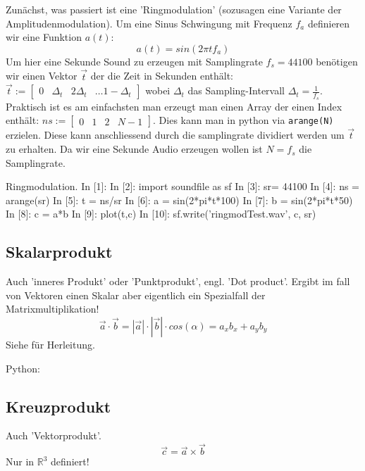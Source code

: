 \begin{answer}
Zunächst, was passiert ist eine 'Ringmodulation' (sozusagen eine Variante der Amplitudenmodulation). Um eine Sinus Schwingung mit Frequenz $f_a$ definieren wir eine Funktion $a(t)$:
\begin{equation}
a(t) = sin(2 \pi t f_a)
\end{equation}
Um hier eine Sekunde Sound zu erzeugen mit Samplingrate $f_s = 44100$ benötigen wir einen Vektor $\vec{t}$ der die Zeit in Sekunden enthält: $\vec{t}:= \begin{bmatrix} 0 & \Delta_t& 2 \Delta_t &  \dots 1-\Delta_t \end{bmatrix}$ wobei $\Delta_t$ das Sampling-Intervall $\Delta_t = \frac{1}{f_s}$. Praktisch ist es am einfachsten man erzeugt man einen Array der einen Index enthält: $ns := \begin{bmatrix} 0 & 1 & 2 &  N-1 \end{bmatrix}$. Dies kann man in python via \texttt{arange(N)} erzielen. Diese kann anschliessend durch die samplingrate dividiert werden um $\vec{t}$ zu erhalten. Da wir eine Sekunde Audio erzeugen wollen ist $N=f_s$ die Samplingrate.


\begin{python}{Ringmodulation.}
In [1]: %
In [2]: import soundfile as sf
In [3]: sr= 44100
In [4]: ns = arange(sr)
In [5]: t = ns/sr
In [6]: a = sin(2*pi*t*100)
In [7]: b = sin(2*pi*t*50)
In [8]: c = a*b
In [9]: plot(t,c)
In [10]: sf.write('ringmodTest.wav', c, sr)
\end{python}
\end{answer}


\subsection*{Skalarprodukt}

Auch 'inneres Produkt' oder 'Punktprodukt', engl. 'Dot product'. Ergibt im fall von Vektoren einen Skalar aber eigentlich ein Spezialfall der Matrixmultiplikation!
$$\vec{a}\cdot \vec{b} = |\vec{a}|\cdot |\vec{b}|\cdot cos(\alpha) = a_x b_x + a_y b_y$$
Siehe \citep[p.~45]{Westermmann2008}  für Herleitung.

Python: 

\subsection*{Kreuzprodukt}
Auch 'Vektorprodukt'. 
$$ \vec{c} = \vec{a} \times \vec{b}$$
Nur in $\mathbb{R}^3$ definiert!

